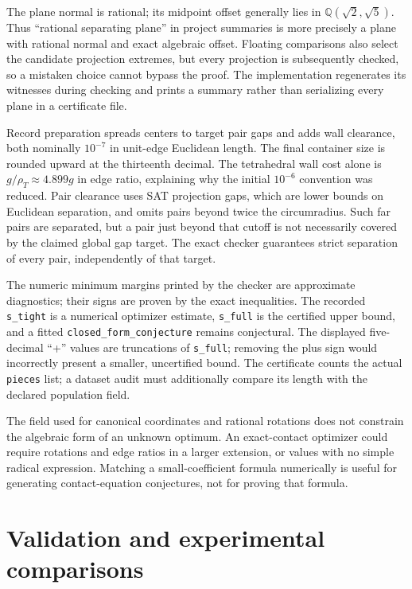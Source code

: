 \documentclass[11pt,a4paper]{article}
\begin{document}
The plane normal is rational; its midpoint offset generally lies in \(\mathbb Q(\sqrt2,\sqrt5)\). Thus ``rational separating plane'' in project summaries is more precisely a plane with rational normal and exact algebraic offset. Floating comparisons also select the candidate projection extremes, but every projection is subsequently checked, so a mistaken choice cannot bypass the proof. The implementation regenerates its witnesses during checking and prints a summary rather than serializing every plane in a certificate file.

Record preparation spreads centers to target pair gaps and adds wall clearance, both nominally \(10^{-7}\) in unit-edge Euclidean length. The final container size is rounded upward at the thirteenth decimal. The tetrahedral wall cost alone is \(g/\rho_T\approx4.899g\) in edge ratio, explaining why the initial \(10^{-6}\) convention was reduced. Pair clearance uses SAT projection gaps, which are lower bounds on Euclidean separation, and omits pairs beyond twice the circumradius. Such far pairs are separated, but a pair just beyond that cutoff is not necessarily covered by the claimed global gap target. The exact checker guarantees strict separation of every pair, independently of that target.

The numeric minimum margins printed by the checker are approximate diagnostics; their signs are proven by the exact inequalities. The recorded \nolinkurl{s_tight} is a numerical optimizer estimate, \nolinkurl{s_full} is the certified upper bound, and a fitted \nolinkurl{closed_form_conjecture} remains conjectural. The displayed five-decimal ``+'' values are truncations of \nolinkurl{s_full}; removing the plus sign would incorrectly present a smaller, uncertified bound. The certificate counts the actual \nolinkurl{pieces} list; a dataset audit must additionally compare its length with the declared population field.

The field used for canonical coordinates and rational rotations does not constrain the algebraic form of an unknown optimum. An exact-contact optimizer could require rotations and edge ratios in a larger extension, or values with no simple radical expression. Matching a small-coefficient formula numerically is useful for generating contact-equation conjectures, not for proving that formula.

\section{Validation and experimental comparisons}
\end{document}
